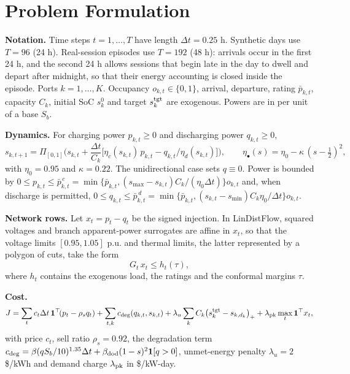 \documentclass[11pt]{article}
\begin{document}
\section{Problem Formulation}\label{sec:form}
\textbf{Notation.} Time steps $t=1,\dots,T$ have length $\Delta t=0.25$ h. Synthetic days use $T=96$ (24 h). Real-session episodes use $T=192$ (48 h): arrivals occur in the first 24 h, and the second 24 h allows sessions that begin late in the day to dwell and depart after midnight, so that their energy accounting is closed inside the episode. Ports $k=1,\dots,K$. Occupancy $o_{k,t}\in\{0,1\}$, arrival, departure, rating $\bar p_{k,t}$, capacity $C_k$, initial SoC $s^0_k$ and target $s^{\rm tgt}_k$ are exogenous. Powers are in per unit of a base $S_b$.

\textbf{Dynamics.} For charging power $p_{k,t}\ge0$ and discharging power $q_{k,t}\ge0$,
\begin{equation}
s_{k,t+1}=\Pi_{[0,1]}\Big(s_{k,t}+\frac{\Delta t}{C_k}\big[\eta_c(s_{k,t})\,p_{k,t}-q_{k,t}/\eta_d(s_{k,t})\big]\Big),\qquad \eta_\bullet(s)=\eta_0-\kappa\,(s-\tfrac12)^2,
\end{equation}
with $\eta_0=0.95$ and $\kappa=0.22$. The unidirectional case sets $q\equiv0$. Power is bounded by $0\le p_{k,t}\le\bar p^{\,c}_{k,t}=\min\{\bar p_{k,t},(s_{\max}-s_{k,t})C_k/(\eta_0\Delta t)\}o_{k,t}$ and, when discharge is permitted, $0\le q_{k,t}\le\bar p^{\,d}_{k,t}=\min\{\bar p_{k,t},(s_{k,t}-s_{\min})C_k\eta_0/\Delta t\}o_{k,t}$.

\textbf{Network rows.} Let $x_t=p_t-q_t$ be the signed injection. In LinDistFlow, squared voltages and branch apparent-power surrogates are affine in $x_t$, so that the voltage limits $[0.95,1.05]$ p.u. and thermal limits, the latter represented by a polygon of cuts, take the form
\begin{equation}
G_t\,x_t\le h_t(\tau),\label{eq:poly}
\end{equation}
where $h_t$ contains the exogenous load, the ratings and the conformal margins $\tau$.

\textbf{Cost.}
\begin{equation}
J=\sum_t c_t\Delta t\,\mathbf 1^\top\!(p_t-\rho_s q_t)+\sum_{t,k}c_{\rm deg}(q_{k,t},s_{k,t})+\lambda_u\sum_k C_k\big(s^{\rm tgt}_k-s_{k,d_k}\big)_+ +\lambda_{\rm pk}\max_t \mathbf 1^\top x_t,
\end{equation}
with price $c_t$, sell ratio $\rho_s=0.92$, the degradation term $c_{\rm deg}=\beta (q S_b/10)^{1.35}\Delta t+\beta_{\rm dod}(1-s)^2\mathbf 1[q>0]$, unmet-energy penalty $\lambda_u=2$ \$/kWh and demand charge $\lambda_{\rm pk}$ in \$/kW-day.
\end{document}
